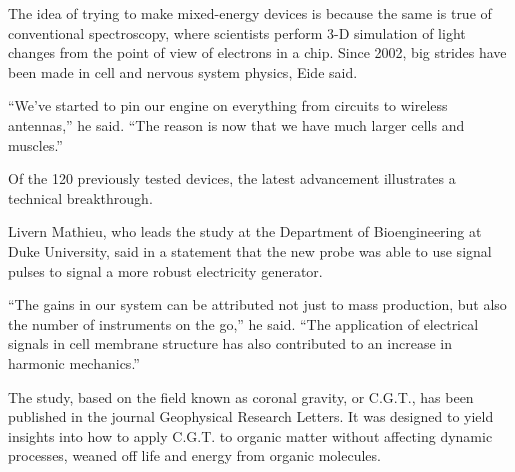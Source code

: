 \documentclass{article}
\begin{document}
The idea of trying to make mixed-energy devices is because the same is true of conventional spectroscopy, where scientists perform 3-D simulation of light changes from the point of view of electrons in a chip. Since 2002, big strides have been made in cell and nervous system physics, Eide said.

“We’ve started to pin our engine on everything from circuits to wireless antennas,” he said. “The reason is now that we have much larger cells and muscles.”

Of the 120 previously tested devices, the latest advancement illustrates a technical breakthrough.

Livern Mathieu, who leads the study at the Department of Bioengineering at Duke University, said in a statement that the new probe was able to use signal pulses to signal a more robust electricity generator.

“The gains in our system can be attributed not just to mass production, but also the number of instruments on the go,” he said. “The application of electrical signals in cell membrane structure has also contributed to an increase in harmonic mechanics.”

The study, based on the field known as coronal gravity, or C.G.T., has been published in the journal Geophysical Research Letters. It was designed to yield insights into how to apply C.G.T. to organic matter without affecting dynamic processes, weaned off life and energy from organic molecules.
\end{document}
